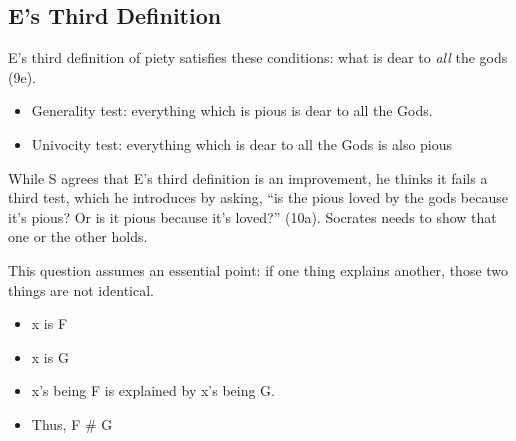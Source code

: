 \documentclass[oneside]{article}
\begin{document}
\begin{description}










\section*{E's Third Definition}
E's third definition of piety satisfies these conditions: what is dear to \emph{all} the gods (9e). 
\begin{itemize} 
\item Generality test:  everything which is pious is dear to all the Gods. 
\item Univocity test: everything which is dear to all the Gods is also pious
\end{itemize}
While S agrees that E's third definition is an improvement, he thinks it fails a third test, which he introduces by asking, ``is the pious loved by the gods because it's pious? Or is it pious because it's loved?'' (10a). Socrates needs to show that one or the other holds. 

This question assumes an essential point: if one thing explains another, those two things are not identical. 

\begin{itemize}
\item x is F
\item x is G
\item x's being F is explained by x's being G.
\item Thus, F \# G
\end{itemize}




\end{description}
\end{document}
